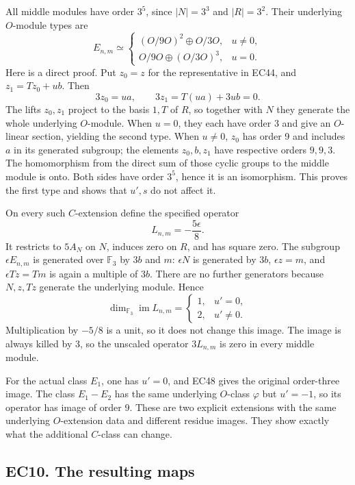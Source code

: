 \documentclass[
  10pt,
  a4paper,
]{article}
\begin{document}
All middle modules have order \(3^5\), since \(|N|=3^3\) and
\(|R|=3^2\). Their underlying \(O\)-module types are \[
E_{n,m}\simeq
\begin{cases}
(O/9O)^2\oplus O/3O,&u\ne0,\\
O/9O\oplus(O/3O)^3,&u=0.
\end{cases}
\tag{EC46}
\] Here is a direct proof. Put \(z_0=z\) for the representative in EC44,
and \(z_1=Tz_0+u b\). Then \[
3z_0=u a,\qquad 3z_1=T(u a)+3u b=0.
\] The lifts \(z_0,z_1\) project to the basis \(1,T\) of \(R\), so
together with \(N\) they generate the whole underlying \(O\)-module.
When \(u=0\), they each have order 3 and give an \(O\)-linear section,
yielding the second type. When \(u\ne0\), \(z_0\) has order 9 and
includes \(a\) in its generated subgroup; the elements \(z_0,b,z_1\)
have respective orders \(9,9,3\). The homomorphism from the direct sum
of those cyclic groups to the middle module is onto. Both sides have
order \(3^5\), hence it is an isomorphism. This proves the first type
and shows that \(u',s\) do not affect it.

On every such \(C\)-extension define the specified operator \[
L_{n,m}=-\frac{5\epsilon}{8}.
\tag{EC47}
\] It restricts to \(5A_N\) on \(N\), induces zero on \(R\), and has
square zero. The subgroup \(\epsilon E_{n,m}\) is generated over
\(\mathbb F_3\) by \(3b\) and \(m\): \(\epsilon N\) is generated by
\(3b\), \(\epsilon z=m\), and \(\epsilon Tz=Tm\) is again a multiple of
\(3b\). There are no further generators because \(N,z,Tz\) generate the
underlying module. Hence \[
\dim_{\mathbb F_3}\operatorname{im}L_{n,m}
=\begin{cases}
1,&u'=0,\\
2,&u'\ne0.
\end{cases}
\tag{EC48}
\] Multiplication by \(-5/8\) is a unit, so it does not change this
image. The image is always killed by 3, so the unscaled operator
\(3L_{n,m}\) is zero in every middle module.

For the actual class \(E_1\), one has \(u'=0\), and EC48 gives the
original order-three image. The class \(E_1-E_2\) has the same
underlying \(O\)-class \(\varphi\) but \(u'=-1\), so its operator has
image of order 9. These are two explicit extensions with the same
underlying \(O\)-extension data and different residue images. They show
exactly what the additional \(C\)-class can change.

\subsection{EC10. The resulting maps}\label{ec10.-the-resulting-maps}
\end{document}
